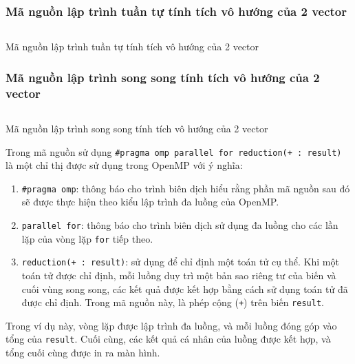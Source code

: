 \subsubsection{Mã nguồn lập trình tuần tự tính tích vô hướng của 2 vector}
\begin{listing}[H]
 \centering
 \inputminted{cpp}{sources/MaNguon2TT.cpp}
 \caption{Mã nguồn lập trình tuần tự tính tích vô hướng của 2 vector}
 \label{code:MaNguon2TT}
\end{listing}




\subsubsection{Mã nguồn lập trình song song tính tích vô hướng của 2 vector}
\begin{listing}[H]
 \centering
 \inputminted{cpp}{sources/MaNguon2SS.cpp}
 \caption{Mã nguồn lập trình song song tính tích vô hướng của 2 vector}
 \label{code:MaNguon2SS}
\end{listing}

Trong mã nguồn sử dụng \texttt{\#pragma omp parallel for reduction(+ : result)} là một chỉ thị được sử dụng trong OpenMP với ý nghĩa:

\begin{enumerate}
 \item \texttt{\#pragma omp}: thông báo cho trình biên dịch hiểu rằng phần mã nguồn sau đó sẽ được thực hiện theo kiểu lập trình đa luồng của OpenMP.

 \item \texttt{parallel for}: thông báo cho trình biên dịch sử dụng đa luồng cho các lần lặp của vòng lặp \texttt{for} tiếp theo.

 \item \texttt{reduction(+ : result)}: sử dụng để chỉ định một toán tử cụ thể. Khi một toán tử được chỉ định, mỗi luồng duy trì một bản sao riêng tư của biến và cuối vùng song song, các kết quả được kết hợp bằng cách sử dụng toán tử đã được chỉ định. Trong mã nguồn này, là phép cộng (\texttt{+}) trên biến \texttt{result}.
\end{enumerate}

Trong ví dụ này, vòng lặp được lập trình đa luồng, và mỗi luồng đóng góp vào tổng của \texttt{result}. Cuối cùng, các kết quả cá nhân của luồng được kết hợp, và tổng cuối cùng được in ra màn hình.








